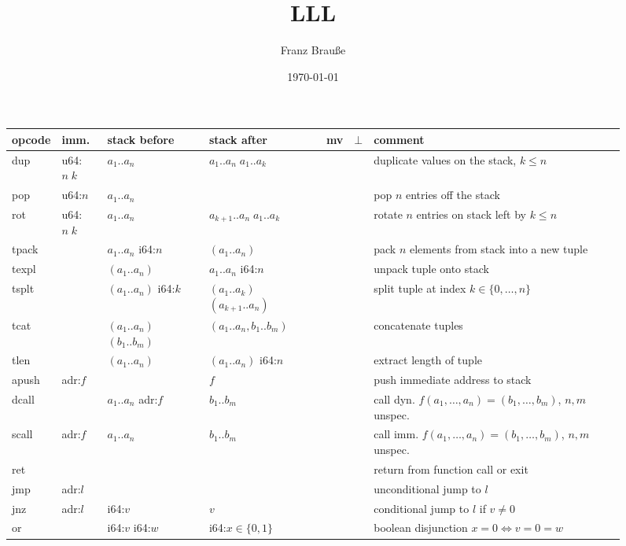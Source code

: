 \documentclass[a4paper,parskip=half]{scrartcl}
\author{Franz Brauße}
\title{LLL}
\date{\today}
\begin{document}
\begin{figure}[h]
\centering
\begin{tabular}{l|l|l|l@{\;\,\vline\,}c@{\,\vline\,}c@{\,\vline\;\,}p{9cm}}
  opcode & imm. & stack before & stack after & mv & $\bot$ & comment \\ \hline
  \ttfamily dup & u64:$n\;k$ & $a_1..a_n$ & $a_1..a_n\;a_1..a_k$     &&& duplicate values on the stack, $k\leq n$ \\
  \ttfamily pop & u64:$n$    & $a_1..a_n$ &                          &&& pop $n$ entries off the stack \\
  \ttfamily rot & u64:$n\;k$ & $a_1..a_n$ & $a_{k+1}..a_n\;a_1..a_k$ &&& rotate $n$ entries on stack left by $k\leq n$ \\
  \hline
  \ttfamily tpack &         & $a_1..a_n$ i64:$n$        & $(a_1..a_n)$                  &&& pack $n$ elements from stack into a new tuple \\
  \ttfamily texpl &         & $(a_1..a_n)$              & $a_1..a_n$ i64:$n$            &&& unpack tuple onto stack \\
  \ttfamily tsplt &         & $(a_1..a_n)$ i64:$k$      & $(a_1..a_k)$ $(a_{k+1}..a_n)$ &&& split tuple at index $k\in\{0,\ldots,n\}$ \\
  \ttfamily tcat  &         & $(a_1..a_n)$ $(b_1..b_m)$ & $(a_1..a_n,b_1..b_m)$         &&& concatenate tuples \\
  \ttfamily tlen  &         & $(a_1..a_n)$              & $(a_1..a_n)$ i64:$n$          &&& extract length of tuple \\
  \hline
  \ttfamily apush & adr:$f$ &                    & $f$        &&& push immediate address to stack \\
  \ttfamily dcall &         & $a_1..a_n$ adr:$f$ & $b_1..b_m$ &&& call dyn. $f(a_1,\ldots,a_n) = (b_1,\ldots,b_m)$, $n,m$ unspec. \\
  \ttfamily scall & adr:$f$ & $a_1..a_n$         & $b_1..b_m$ &&& call imm. $f(a_1,\ldots,a_n) = (b_1,\ldots,b_m)$, $n,m$ unspec. \\
  \ttfamily ret   &         &                    &            &&& return from function call or exit \\
  \ttfamily jmp   & adr:$l$ &                    &            &&& unconditional jump to $l$ \\
  \ttfamily jnz   & adr:$l$ & i64:$v$            & $v$        &&& conditional jump to $l$ if $v\neq 0$ \\
  \hline
  \ttfamily or    &         & i64:$v$ i64:$w$ & i64:$x\in\{0,1\}$ &&& boolean disjunction $x=0\iff v=0=w$ \\

\end{tabular}
\end{figure}
\end{document}
